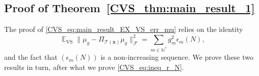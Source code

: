 \documentclass[twoside,11pt]{book}
\numberwithin{theorem}{chapter}
\numberwithin{definition}{chapter}
\numberwithin{proposition}{chapter}
\numberwithin{corollary}{chapter}
\numberwithin{example}{chapter}
\numberwithin{lemma}{chapter}
\numberwithin{assumption}{chapter}
\DeclareMathOperator{\VS}{\mathrm{VS}}
\DeclareMathOperator{\Tran}{\intercal}
\DeclareMathOperator{\EX}{\mathbb{E}}
\DeclareMathOperator{\F}{\mathcal{F}}
\DeclareMathOperator{\Ns}{\mathbb{N}^{*}}
\begin{document}

\subsection{Proof of Theorem~\ref{CVS_thm:main_result_1}}\label{CVS_app:proof_main_result_1}
The proof of \eqref{CVS_eq:main_result_EX_VS_err_mu} relies on the identity
\begin{equation}\label{CVS_eq:main_result_EX_VS_err_mu_2}
\EX_{\VS} \|\mu_{g} - \Pi_{\mathcal{T}(\bm{x})} \mu_{g}\|_{\F}^{2} = \sum\limits_{m \in \mathbb{N}^{*}} g_{m}^{2} \epsilon_{m}(N),
\end{equation}
and the fact that $(\epsilon_{m}(N))$ is a non-increasing sequence. We prove these two results in turn, after what we prove \eqref{CVS_eq:ineq_r_N}.
\end{document}
